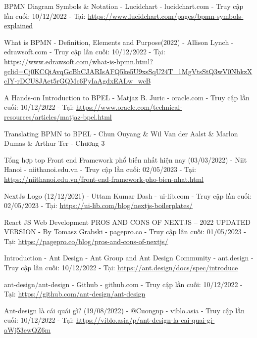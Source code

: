 
\begin{thebibliography}{80}
    BPMN Diagram Symbols \& Notation - Lucidchart - lucidchart.com - Truy cập lần cuối: 10/12/2022 - Tại: \url{https://www.lucidchart.com/pages/bpmn-symbols-explained}

    What is BPMN - Definition, Elements and Purpose(2022) - Allison Lynch - edrawsoft.com - Truy cập lần cuối: 10/12/2022 - Tại: \url{https://www.edrawsoft.com/what-is-bpmn.html?gclid=Cj0KCQiAvqGcBhCJARIsAFQ5ke5U9xsSqU24T_1MgVtsStQ3wV0NbkzXcIY-rDCU8JAet5rGQMc6PyIaAgdxEALw_wcB}

    A Hands-on Introduction to BPEL - Matjaz B. Juric - oracle.com - Truy cập lần cuối: 10/12/2022 - Tại: \url{https://www.oracle.com/technical-resources/articles/matjaz-bpel.html}

    Translating BPMN to BPEL - Chun Ouyang \& Wil Van der Aalst \& Marlon Dumas \& Arthur Ter - Chương 3

    Tổng hợp top Front end Framework phổ biến nhất hiện nay (03/03/2022) - Niit Hanoi - niithanoi.edu.vn
    - Truy cập lần cuối: 02/05/2023 - Tại: \url{https://niithanoi.edu.vn/front-end-framework-pho-bien-nhat.html}

    NextJs Logo (12/12/2021) - Uttam Kumar Dash - ui-lib.com
    - Truy cập lần cuối: 02/05/2023 - Tại: \url{https://ui-lib.com/blog/nextjs-boilerplates/}


    React JS Web Development PROS AND CONS OF NEXTJS – 2022 UPDATED VERSION - By Tomasz Grabski - pagepro.co - Truy cập lần cuối: 01/05/2023 - Tại: \url{https://pagepro.co/blog/pros-and-cons-of-nextjs/}

    Introduction - Ant Design - Ant Group and Ant Design Community - ant.design - Truy cập lần cuối: 10/12/2022 - Tại: \url{https://ant.design/docs/spec/introduce}

    ant-design/ant-design - Github - github.com - Truy cập lần cuối: 10/12/2022 - Tại: \url{https://github.com/ant-design/ant-design}

    Ant-design là cái quái gì? (19/08/2022) - @Cuongnp - viblo.asia - Truy cập lần cuối: 10/12/2022 - Tại: \url{https://viblo.asia/p/ant-design-la-cai-quai-gi-aWj53ewQZ6m}



\end{thebibliography}
